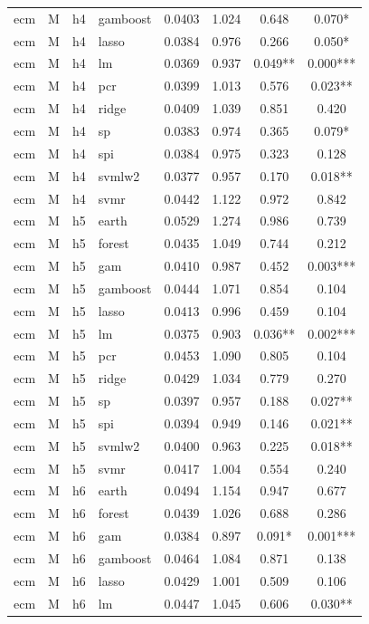 \begin{ThreePartTable}
\begin{longtable}[t]{llclcccc}
ecm & M & h4 & gamboost & 0.0403 & 1.024 & 0.648 & 0.070*\\
ecm & M & h4 & lasso & 0.0384 & 0.976 & 0.266 & 0.050*\\
ecm & M & h4 & lm & 0.0369 & 0.937 & 0.049** & 0.000***\\
ecm & M & h4 & pcr & 0.0399 & 1.013 & 0.576 & 0.023**\\
ecm & M & h4 & ridge & 0.0409 & 1.039 & 0.851 & 0.420\\
ecm & M & h4 & sp & 0.0383 & 0.974 & 0.365 & 0.079*\\
ecm & M & h4 & spi & 0.0384 & 0.975 & 0.323 & 0.128\\
ecm & M & h4 & svmlw2 & 0.0377 & 0.957 & 0.170 & 0.018**\\
ecm & M & h4 & svmr & 0.0442 & 1.122 & 0.972 & 0.842\\
\addlinespace
ecm & M & h5 & earth & 0.0529 & 1.274 & 0.986 & 0.739\\
ecm & M & h5 & forest & 0.0435 & 1.049 & 0.744 & 0.212\\
ecm & M & h5 & gam & 0.0410 & 0.987 & 0.452 & 0.003***\\
ecm & M & h5 & gamboost & 0.0444 & 1.071 & 0.854 & 0.104\\
ecm & M & h5 & lasso & 0.0413 & 0.996 & 0.459 & 0.104\\
ecm & M & h5 & lm & 0.0375 & 0.903 & 0.036** & 0.002***\\
ecm & M & h5 & pcr & 0.0453 & 1.090 & 0.805 & 0.104\\
ecm & M & h5 & ridge & 0.0429 & 1.034 & 0.779 & 0.270\\
ecm & M & h5 & sp & 0.0397 & 0.957 & 0.188 & 0.027**\\
ecm & M & h5 & spi & 0.0394 & 0.949 & 0.146 & 0.021**\\
ecm & M & h5 & svmlw2 & 0.0400 & 0.963 & 0.225 & 0.018**\\
ecm & M & h5 & svmr & 0.0417 & 1.004 & 0.554 & 0.240\\
\addlinespace
ecm & M & h6 & earth & 0.0494 & 1.154 & 0.947 & 0.677\\
ecm & M & h6 & forest & 0.0439 & 1.026 & 0.688 & 0.286\\
ecm & M & h6 & gam & 0.0384 & 0.897 & 0.091* & 0.001***\\
ecm & M & h6 & gamboost & 0.0464 & 1.084 & 0.871 & 0.138\\
ecm & M & h6 & lasso & 0.0429 & 1.001 & 0.509 & 0.106\\
ecm & M & h6 & lm & 0.0447 & 1.045 & 0.606 & 0.030**\\

\end{longtable}
\end{ThreePartTable}
